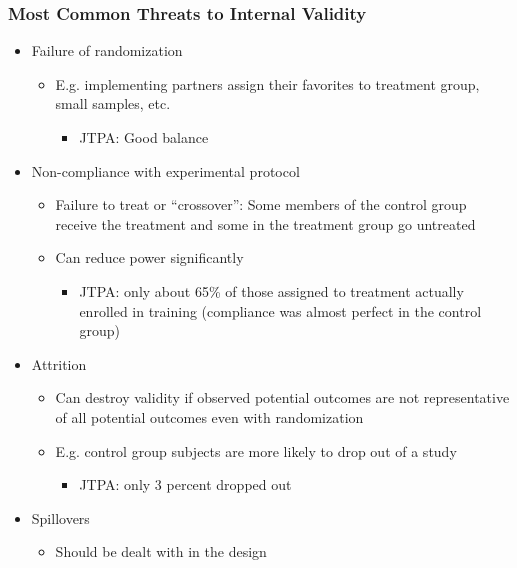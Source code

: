 \documentclass{beamer}
\numberwithin{equation}{section}
\begin{document}
\begin{frame}
  \frametitle{Most Common Threats to Internal Validity}
  \small
\begin{itemize}
\item Failure of randomization
 \begin{itemize}
   \item E.g. implementing partners assign their favorites to treatment group, small samples, etc.
   \begin{itemize}
   \item JTPA:  Good balance
 \end{itemize} 
 \end{itemize}\medskip
 \item Non-compliance with experimental protocol
 \begin{itemize}
   \item Failure to treat or ``crossover'':  Some members of the control group receive the treatment and some in the treatment group go untreated
      \item Can reduce power significantly
      \begin{itemize}
   \item JTPA: only about 65\% of those assigned to treatment actually enrolled in training (compliance was almost perfect in
the control group)
 \end{itemize} 

 \end{itemize}\medskip
 \item Attrition
 \begin{itemize}
 \item Can destroy validity if observed potential
    outcomes are not representative of all potential outcomes even with
    randomization
   \item E.g. control group subjects are more likely to drop out of a study %
         \begin{itemize}
   \item JTPA: only 3 percent dropped out
 \end{itemize}
 \end{itemize}
 \item Spillovers
          \begin{itemize}
   \item     Should be dealt with in the design
\end{itemize}
\end{itemize}
\end{frame}
\end{document}
